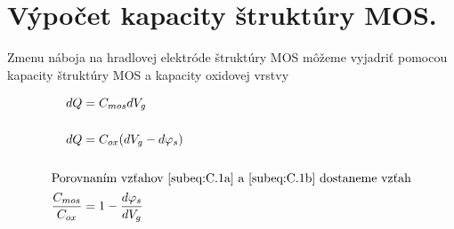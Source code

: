 
\chapter{Výpočet kapacity štruktúry MOS.} %

\label{app:AppendixC} %


Zmenu náboja na hradlovej elektróde štruktúry MOS môžeme vyjadriť
pomocou kapacity štruktúry MOS a kapacity oxidovej vrstvy

\begin{subequations}\label{eq:C.1}
\begin{align}
dQ &= C_{mos} dV_g\label{subeq:C.1a}\\[0.5cm]
dQ &= C_{ox} (dV_g - d\varphi_s)\label{subeq:C.1b}\\[0.5cm]
\intertext{Porovnaním vzťahov \ref{subeq:C.1a} a \ref{subeq:C.1b} dostaneme vzťah}
\frac{C_{mos}}{C_{ox}} &= 1 - \frac{d\varphi_s}{dV_g}\label{subeq:C.1c}
\end{align}
\end{subequations}

